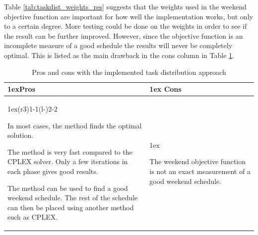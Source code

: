 Table \ref{tab:taskdist_weights_res} suggests that the weights used in the weekend objective function are important for how well the implementation works, but only to a certain degree. More testing could be done on the weights in order to see if the result can be further improved. However, since the objective function is an incomplete measure of a good schedule the results will never be completely optimal. This is listed as the main drawback in the cons column in Table \ref{tab:pros_cons_task_scheduling}. 

\begin{table}[!ht]
\caption{Pros and cons with the implemented task distribution approach}
\label{tab:pros_cons_task_scheduling}
\begin{tabularx}{\linewidth}{>{\parskip1ex}X@{\kern4\tabcolsep}>{\parskip1ex}X}
\toprule
\hfil\bfseries Pros
&
\hfil\bfseries Cons
\\\cmidrule(r{3\tabcolsep}){1-1}\cmidrule(l{-\tabcolsep}){2-2}

In most cases, the method finds the optimal solution. \par
The method is very fast compared to the CPLEX solver. Only a few iterations in each phase gives good results. \par
The method can be used to find a good weekend schedule. The rest of the schedule can then be placed using another method such as CPLEX. \par

&

The weekend objective function is not an exact measurement of a good weekend schedule. \par


\\\bottomrule
\end{tabularx}
\end{table}

